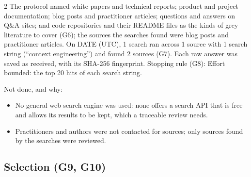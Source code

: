 \documentclass[10pt,a4paper]{article}
\begin{document}
\begin{multicols}{2}
The protocol named white papers and technical reports; product and project documentation; blog posts and practitioner articles; questions and answers on Q\&A sites; and code repositories and their README files as the kinds of grey literature to cover (G6); the sources the searches found were blog posts and practitioner articles.
On DATE (UTC), 1 search ran across 1 source with 1 search string (``context engineering'') and found 2 sources (G7).
Each raw answer was saved as received, with its SHA-256 fingerprint.
Stopping rule (G8): Effort bounded: the top 20 hits of each search string.

\par\smallskip{}\par\smallskip
Not done, and why:

\begin{itemize}
\item No general web search engine was used: none offers a search API that is free and allows its results to be kept, which a traceable review needs.
\item Practitioners and authors were not contacted for sources; only sources found by the searches were reviewed.
\end{itemize}

\subsection{Selection (G9, G10)}\label{sec:selection-g9-g10}


\end{multicols}
\end{document}
